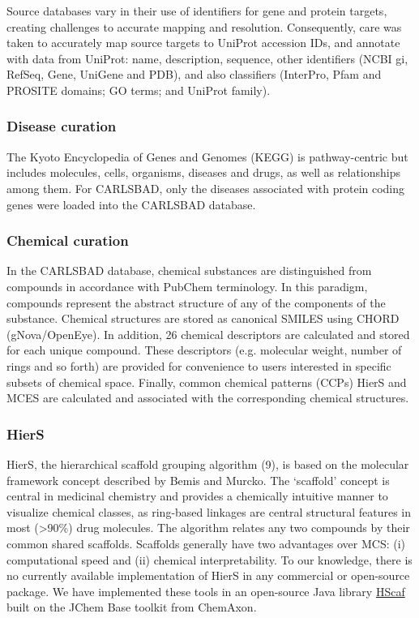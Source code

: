 Source databases vary in their use of identifiers for gene and protein targets, creating challenges to accurate mapping and resolution. Consequently, care was taken to accurately map source targets to UniProt accession IDs, and annotate with data from UniProt\cite{UniProt_Consortium2018-kq}: name, description, sequence, other identifiers (NCBI gi, RefSeq, Gene, UniGene and PDB), and also classifiers (InterPro, Pfam and PROSITE domains; GO terms; and UniProt family).

\subsubsection{Disease curation}

The Kyoto Encyclopedia of Genes and Genomes (KEGG) is pathway-centric but includes molecules, cells, organisms, diseases and drugs, as well as relationships among them\cite{Kanehisa2008-zv}. For CARLSBAD, only the diseases associated with protein coding genes were loaded into the CARLSBAD database.

\subsubsection{Chemical curation}

In the CARLSBAD database, chemical substances are distinguished from compounds in accordance with PubChem terminology. In this paradigm, compounds represent the abstract structure of any of the components of the substance. Chemical structures are stored as canonical SMILES using CHORD (gNova/OpenEye).  In addition, 26 chemical descriptors are calculated and stored for each unique compound. These descriptors (e.g. molecular weight, number of rings and so forth) are provided for convenience to users interested in specific subsets of chemical space. Finally, common chemical patterns (CCPs) HierS and MCES are calculated and associated with the corresponding chemical structures.

\subsubsection{HierS}

HierS, the hierarchical scaffold grouping algorithm\cite{Wilkens2005-ja} (9), is based on the molecular framework concept described by Bemis and Murcko\cite{Bemis1996-jg}. The ‘scaffold’ concept is central in medicinal chemistry and provides a chemically intuitive manner to visualize chemical classes, as ring-based linkages are central structural features in most (\textgreater 90\%) drug molecules. The algorithm relates any two compounds by their common shared scaffolds. Scaffolds generally have two advantages over MCS: (i) computational speed and (ii) chemical interpretability. To our knowledge, there is no currently available implementation of HierS in any commercial or open-source package. We have implemented these tools in an open-source Java library \href{https://github.com/unmtransinfo/unm_biocomp_hscaf}{HScaf} built on the JChem Base toolkit from ChemAxon\cite{ChemAxon2012-py}.

